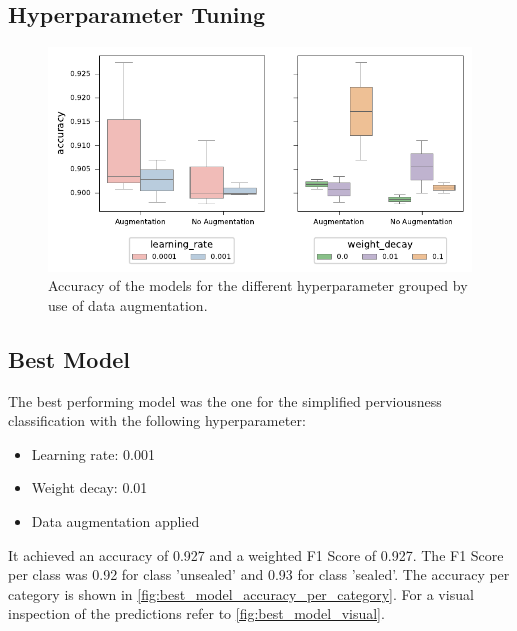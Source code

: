 \subsection{Hyperparameter Tuning}%

\begin{figure}[H]
    \centering
    \captionsetup{width=0.8\linewidth}
    \includegraphics{figures/hp_tuning_boxplot.pdf}
    \caption{Accuracy of the models for the different hyperparameter grouped by use of data augmentation.}
    \label{fig:hp_tuning_boxplot}
\end{figure}



\subsection{Best Model}%

The best performing model was the one for the simplified perviousness classification
with the following hyperparameter:
\begin{itemize}
    \item Learning rate: 0.001
    \item Weight decay: 0.01
    \item Data augmentation applied
\end{itemize}
It achieved an accuracy of 0.927 and a weighted F1 Score of 0.927.
The F1 Score per class was 0.92 for class 'unsealed' and 0.93 for class 'sealed'.
The accuracy per category is shown in \autoref{fig:best_model_accuracy_per_category}.
For a visual inspection of the predictions refer to \autoref{fig:best_model_visual}.

